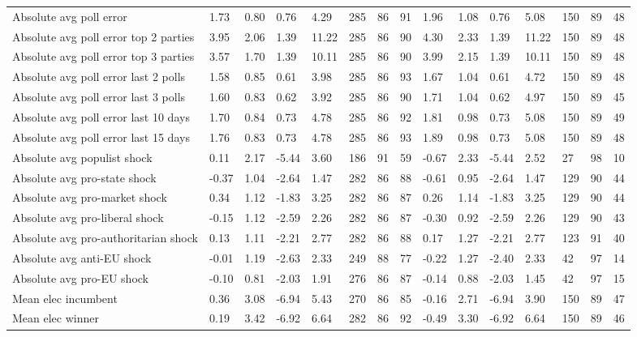 \begin{longtable}{lllllllllllllll}
Absolute avg poll error & 1.73 & 0.80 & 0.76 & 4.29 & 285 & 86 & 91 & 1.96 & 1.08 & 0.76 & 5.08 & 150 & 89 & 48\\
Absolute avg poll error top 2 parties & 3.95 & 2.06 & 1.39 & 11.22 & 285 & 86 & 90 & 4.30 & 2.33 & 1.39 & 11.22 & 150 & 89 & 48\\
Absolute avg poll error top 3 parties & 3.57 & 1.70 & 1.39 & 10.11 & 285 & 86 & 90 & 3.99 & 2.15 & 1.39 & 10.11 & 150 & 89 & 48\\
\addlinespace
Absolute avg poll error last 2 polls & 1.58 & 0.85 & 0.61 & 3.98 & 285 & 86 & 93 & 1.67 & 1.04 & 0.61 & 4.72 & 150 & 89 & 48\\
Absolute avg poll error last 3 polls & 1.60 & 0.83 & 0.62 & 3.92 & 285 & 86 & 90 & 1.71 & 1.04 & 0.62 & 4.97 & 150 & 89 & 45\\
Absolute avg poll error last 10 days & 1.70 & 0.84 & 0.73 & 4.78 & 285 & 86 & 92 & 1.81 & 0.98 & 0.73 & 5.08 & 150 & 89 & 49\\
Absolute avg poll error last 15 days & 1.76 & 0.83 & 0.73 & 4.78 & 285 & 86 & 93 & 1.89 & 0.98 & 0.73 & 5.08 & 150 & 89 & 48\\
Absolute avg populist shock & 0.11 & 2.17 & -5.44 & 3.60 & 186 & 91 & 59 & -0.67 & 2.33 & -5.44 & 2.52 & 27 & 98 & 10\\
\addlinespace
Absolute avg pro-state shock & -0.37 & 1.04 & -2.64 & 1.47 & 282 & 86 & 88 & -0.61 & 0.95 & -2.64 & 1.47 & 129 & 90 & 44\\
Absolute avg pro-market shock & 0.34 & 1.12 & -1.83 & 3.25 & 282 & 86 & 87 & 0.26 & 1.14 & -1.83 & 3.25 & 129 & 90 & 44\\
Absolute avg pro-liberal shock & -0.15 & 1.12 & -2.59 & 2.26 & 282 & 86 & 87 & -0.30 & 0.92 & -2.59 & 2.26 & 129 & 90 & 43\\
Absolute avg pro-authoritarian shock & 0.13 & 1.11 & -2.21 & 2.77 & 282 & 86 & 88 & 0.17 & 1.27 & -2.21 & 2.77 & 123 & 91 & 40\\
Absolute avg anti-EU shock & -0.01 & 1.19 & -2.63 & 2.33 & 249 & 88 & 77 & -0.22 & 1.27 & -2.40 & 2.33 & 42 & 97 & 14\\
\addlinespace
Absolute avg pro-EU shock & -0.10 & 0.81 & -2.03 & 1.91 & 276 & 86 & 87 & -0.14 & 0.88 & -2.03 & 1.45 & 42 & 97 & 15\\
Mean elec incumbent & 0.36 & 3.08 & -6.94 & 5.43 & 270 & 86 & 85 & -0.16 & 2.71 & -6.94 & 3.90 & 150 & 89 & 47\\
Mean elec winner & 0.19 & 3.42 & -6.92 & 6.64 & 282 & 86 & 92 & -0.49 & 3.30 & -6.92 & 6.64 & 150 & 89 & 46\\

\end{longtable}
